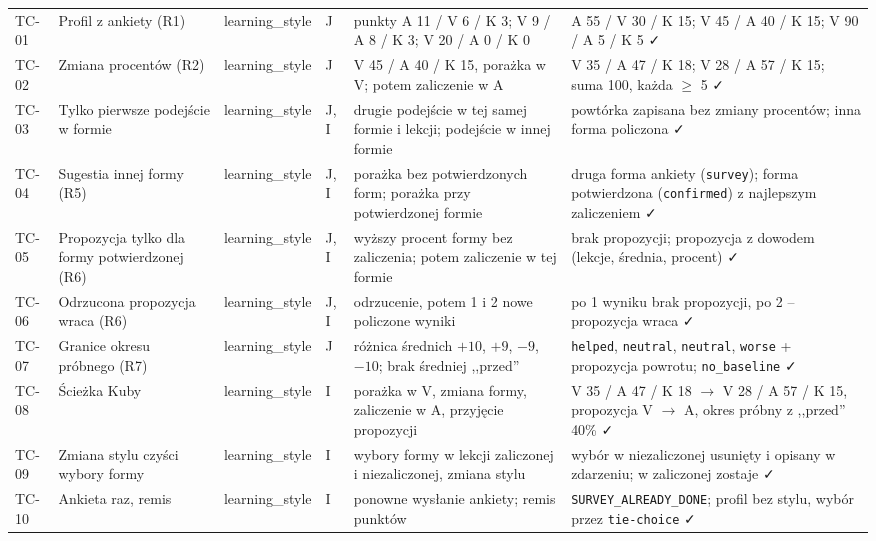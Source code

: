 \begin{longtable}{p{1cm} >{\raggedright\arraybackslash}p{3.2cm} >{\raggedright\arraybackslash}p{1.6cm} p{0.6cm} >{\raggedright\arraybackslash}p{4.3cm} >{\raggedright\arraybackslash}p{4.3cm}}
TC-01 & Profil z ankiety (R1) & learning\_style & J &
  punkty A 11 / V 6 / K 3; V 9 / A 8 / K 3; V 20 / A 0 / K 0 &
  A 55 / V 30 / K 15; V 45 / A 40 / K 15; V 90 / A 5 / K 5 \faCheck \\
\addlinespace
TC-02 & Zmiana procentów (R2) & learning\_style & J &
  V 45 / A 40 / K 15, porażka w V; potem zaliczenie w A &
  V 35 / A 47 / K 18; V 28 / A 57 / K 15; suma 100, każda $\geq$ 5 \faCheck \\
\addlinespace
TC-03 & Tylko pierwsze podejście w formie & learning\_style & J, I &
  drugie podejście w tej samej formie i lekcji; podejście w innej formie &
  powtórka zapisana bez zmiany procentów; inna forma policzona \faCheck \\
\addlinespace
TC-04 & Sugestia innej formy (R5) & learning\_style & J, I &
  porażka bez potwierdzonych form; porażka przy potwierdzonej formie &
  druga forma ankiety (\texttt{survey}); forma potwierdzona (\texttt{confirmed}) z najlepszym zaliczeniem \faCheck \\
\addlinespace
TC-05 & Propozycja tylko dla formy potwierdzonej (R6) & learning\_style & J, I &
  wyższy procent formy bez zaliczenia; potem zaliczenie w tej formie &
  brak propozycji; propozycja z dowodem (lekcje, średnia, procent) \faCheck \\
\addlinespace
TC-06 & Odrzucona propozycja wraca (R6) & learning\_style & J, I &
  odrzucenie, potem 1 i 2 nowe policzone wyniki &
  po 1 wyniku brak propozycji, po 2 -- propozycja wraca \faCheck \\
\addlinespace
TC-07 & Granice okresu próbnego (R7) & learning\_style & J &
  różnica średnich $+10$, $+9$, $-9$, $-10$; brak średniej ,,przed'' &
  \texttt{helped}, \texttt{neutral}, \texttt{neutral}, \texttt{worse} + propozycja powrotu; \texttt{no\_baseline} \faCheck \\
\addlinespace
TC-08 & Ścieżka Kuby & learning\_style & I &
  porażka w V, zmiana formy, zaliczenie w A, przyjęcie propozycji &
  V 35 / A 47 / K 18 $\to$ V 28 / A 57 / K 15, propozycja V $\to$ A, okres próbny z ,,przed'' 40\% \faCheck \\
\addlinespace
TC-09 & Zmiana stylu czyści wybory formy & learning\_style & I &
  wybory formy w lekcji zaliczonej i niezaliczonej, zmiana stylu &
  wybór w niezaliczonej usunięty i opisany w zdarzeniu; w zaliczonej zostaje \faCheck \\
\addlinespace
TC-10 & Ankieta raz, remis & learning\_style & I &
  ponowne wysłanie ankiety; remis punktów &
  409 \texttt{SURVEY\_ALREADY\_DONE}; profil bez stylu, wybór przez \texttt{tie-choice} \faCheck \\

\end{longtable}

